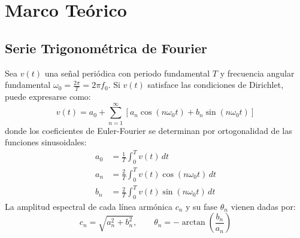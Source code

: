 \documentclass[11pt,a4paper]{article}
\begin{document}
\section{Marco Teórico}

\subsection{Serie Trigonométrica de Fourier}
Sea $v(t)$ una señal periódica con periodo fundamental $T$ y frecuencia angular fundamental $\omega_0 = \frac{2\pi}{T} = 2\pi f_0$. Si $v(t)$ satisface las condiciones de Dirichlet, puede expresarse como:
\begin{equation}
    v(t) = a_0 + \sum_{n=1}^\infty \left[ a_n \cos(n\omega_0 t) + b_n \sin(n\omega_0 t) \right]
    \label{eq:fourier_trig}
\end{equation}
donde los coeficientes de Euler-Fourier se determinan por ortogonalidad de las funciones sinusoidales:
\begin{align}
    a_0 &= \frac{1}{T} \int_0^T v(t)\, dt \label{eq:a0_def}\\
    a_n &= \frac{2}{T} \int_0^T v(t) \cos(n\omega_0 t)\, dt \label{eq:an_def}\\
    b_n &= \frac{2}{T} \int_0^T v(t) \sin(n\omega_0 t)\, dt \label{eq:bn_def}
\end{align}
La amplitud espectral de cada línea armónica $c_n$ y su fase $\theta_n$ vienen dadas por:
\begin{equation}
    c_n = \sqrt{a_n^2 + b_n^2}, \qquad \theta_n = -\arctan\left(\frac{b_n}{a_n}\right)
\end{equation}
\end{document}
